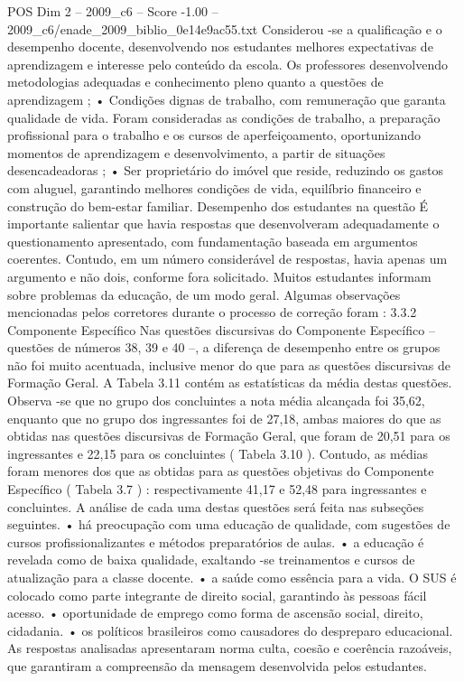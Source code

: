 \begin{textsample}{POS Dim 2 – 2009\_c6 – Score -1.00 – 2009\_c6/enade\_2009\_biblio\_0e14e9ac55.txt}
Considerou -se a qualificação e o desempenho docente, desenvolvendo nos estudantes melhores expectativas de aprendizagem e interesse pelo conteúdo da escola.
Os professores desenvolvendo metodologias adequadas e conhecimento pleno quanto a questões de aprendizagem ; • Condições dignas de trabalho, com remuneração que garanta qualidade de vida.
Foram consideradas as condições de trabalho, a preparação profissional para o trabalho e os cursos de aperfeiçoamento, oportunizando momentos de aprendizagem e desenvolvimento, a partir de situações desencadeadoras ; • Ser proprietário do imóvel que reside, reduzindo os gastos com aluguel, garantindo melhores condições de vida, equilíbrio financeiro e construção do bem-estar familiar.
Desempenho dos estudantes na questão É importante salientar que havia respostas que desenvolveram adequadamente o questionamento apresentado, com fundamentação baseada em argumentos coerentes.
Contudo, em um número considerável de respostas, havia apenas um argumento e não dois, conforme fora solicitado.
Muitos estudantes informam sobre problemas da educação, de um modo geral.
Algumas observações mencionadas pelos corretores durante o processo de correção foram : 3.3.2 Componente Específico Nas questões discursivas do Componente Específico – questões de números 38, 39 e 40 –, a diferença de desempenho entre os grupos não foi muito acentuada, inclusive menor do que para as questões discursivas de Formação Geral.
A Tabela 3.11 contém as estatísticas da média destas questões.
Observa -se que no grupo dos concluintes a nota média alcançada foi 35,62, enquanto que no grupo dos ingressantes foi de 27,18, ambas maiores do que as obtidas nas questões discursivas de Formação Geral, que foram de 20,51 para os ingressantes e 22,15 para os concluintes ( Tabela 3.10 ).
Contudo, as médias foram menores dos que as obtidas para as questões objetivas do Componente Específico ( Tabela 3.7 ) : respectivamente 41,17 e 52,48 para ingressantes e concluintes.
A análise de cada uma destas questões será feita nas subseções seguintes. • há preocupação com uma educação de qualidade, com sugestões de cursos profissionalizantes e métodos preparatórios de aulas. • a educação é revelada como de baixa qualidade, exaltando -se treinamentos e cursos de atualização para a classe docente. • a saúde como essência para a vida.
O SUS é colocado como parte integrante de direito social, garantindo às pessoas fácil acesso. • oportunidade de emprego como forma de ascensão social, direito, cidadania. • os políticos brasileiros como causadores do despreparo educacional.
As respostas analisadas apresentaram norma culta, coesão e coerência razoáveis, que garantiram a compreensão da mensagem desenvolvida pelos estudantes.

\end{textsample}
